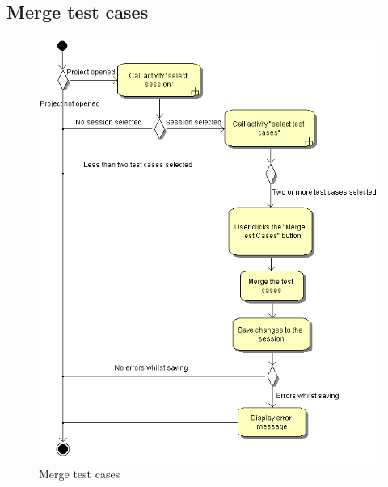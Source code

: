 \subsection{Merge test cases}
\begin{figure}[htb]
 \centering
 \includegraphics[height=0.7\textheight]{images/Activities/merge_test_cases.png}
 \caption{Merge test cases}
 \label{ac_fg:merge_test_cases}
\end{figure}

\clearpage
